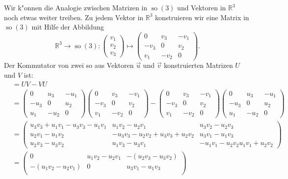 \begin{beispiel}
Wir k"onnen die Analogie zwischen Matrizen in $\operatorname{so}(3)$ und
Vektoren in $\mathbb R^3$ noch etwas weiter treiben. Zu jedem Vektor
in $\mathbb R^3$ konstruieren wir eine Matrix in $\operatorname{so}(3)$
mit Hilfe der Abbildung
\[
\mathbb R^3\to\operatorname{so}(3)
:
\begin{pmatrix}v_1\\v_2\\v_3\end{pmatrix}
\mapsto
\begin{pmatrix}
  0 & v_3&-v_1\\
-v_3&  0 & v_2\\
 v_1&-v_2&  0
\end{pmatrix}.
\]
Der Kommutator von zwei so aus Vektoren $\vec u$ und $\vec v$
konstruierten Matrizen $U$ und $V$ ist:
\begin{align*}
[U,V]
&=
UV-VU
\\
&=
\begin{pmatrix}
  0 & u_3&-u_1\\
-u_3&  0 & u_2\\
 u_1&-u_2&  0
\end{pmatrix}
\begin{pmatrix}
  0 & v_3&-v_1\\
-v_3&  0 & v_2\\
 v_1&-v_2&  0
\end{pmatrix}
-
\begin{pmatrix}
  0 & v_3&-v_1\\
-v_3&  0 & v_2\\
 v_1&-v_2&  0
\end{pmatrix}
\begin{pmatrix}
  0 & u_3&-u_1\\
-u_3&  0 & u_2\\
 u_1&-u_2&  0
\end{pmatrix}
\\
&=
\begin{pmatrix}
u_3v_3+u_1v_1 - u_3v_3 - u_1v_1
	& u_1v_2 - u_2v_1
		& u_3v_2 - u_2v_3 
\\
u_2v_1 - u_1v_2
	& -u_3v_3-u_2v_2 + u_3v_3+u_2v_2
		& u_3v_1 - u_1v_3
\\
u_2v_3 - u_3v_2         
	& u_1v_3 - u_3v_1
		&-u_1v_1-u_2v_2 u_1v_1+u_2v_2
\end{pmatrix}
\\
&=
\begin{pmatrix}
0
	& u_1v_2 - u_2v_1
		&-(u_2v_3-u_3v_2)
\\
-( u_1v_2 - u_2v_1)
	& 0
		& u_3v_1 - u_1v_3
\\

\end{pmatrix}
\end{align*}
\end{beispiel}
